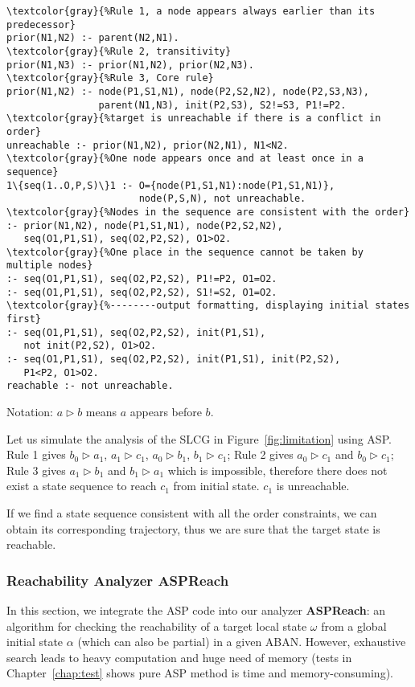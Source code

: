 \begin{Verbatim}[commandchars=\\\{\}]
\textcolor{gray}{%Rule 1, a node appears always earlier than its predecessor}
prior(N1,N2) :- parent(N2,N1).
\textcolor{gray}{%Rule 2, transitivity}
prior(N1,N3) :- prior(N1,N2), prior(N2,N3).
\textcolor{gray}{%Rule 3, Core rule}
prior(N1,N2) :- node(P1,S1,N1), node(P2,S2,N2), node(P2,S3,N3), 
                parent(N1,N3), init(P2,S3), S2!=S3, P1!=P2. 
\textcolor{gray}{%target is unreachable if there is a conflict in order}
unreachable :- prior(N1,N2), prior(N2,N1), N1<N2.
\textcolor{gray}{%One node appears once and at least once in a sequence}
1\{seq(1..O,P,S)\}1 :- O={node(P1,S1,N1):node(P1,S1,N1)},
                       node(P,S,N), not unreachable.
\textcolor{gray}{%Nodes in the sequence are consistent with the order}
:- prior(N1,N2), node(P1,S1,N1), node(P2,S2,N2),
   seq(O1,P1,S1), seq(O2,P2,S2), O1>O2.
\textcolor{gray}{%One place in the sequence cannot be taken by multiple nodes}
:- seq(O1,P1,S1), seq(O2,P2,S2), P1!=P2, O1=O2.
:- seq(O1,P1,S1), seq(O2,P2,S2), S1!=S2, O1=O2.
\textcolor{gray}{%--------output formatting, displaying initial states first}
:- seq(O1,P1,S1), seq(O2,P2,S2), init(P1,S1),
   not init(P2,S2), O1>O2.
:- seq(O1,P1,S1), seq(O2,P2,S2), init(P1,S1), init(P2,S2),
   P1<P2, O1>O2.
reachable :- not unreachable.
\end{Verbatim}

Notation: $a\rhd b$ means $a$ appears before $b$.

\begin{example}
Let us simulate the analysis of the SLCG in Figure~\ref{fig:limitation} using ASP.
Rule 1 gives $b_0\rhd a_1$, $a_1\rhd c_1$, $a_0\rhd b_1$, $b_1\rhd c_1$; Rule 2 gives $a_0\rhd c_1$ and $b_0\rhd c_1$; Rule 3 gives $a_1\rhd b_1$ and $b_1\rhd a_1$ which is impossible, therefore there does not exist a state sequence to reach $c_1$ from initial state.
$c_1$ is unreachable.
\end{example}


If we find a state sequence consistent with all the order constraints, we can obtain its corresponding trajectory, thus we are sure that the target state is reachable.
\subsubsection{Reachability Analyzer ASPReach}
In this section, we integrate the ASP code into our analyzer \textbf{ASPReach}: an algorithm for checking the reachability of a target local state $\omega$ from a global initial state $\alpha$ (which can also be partial) in a given ABAN.
However, exhaustive search leads to heavy computation and huge need of memory (tests in Chapter~\ref{chap:test} shows pure ASP method is time and memory-consuming).



